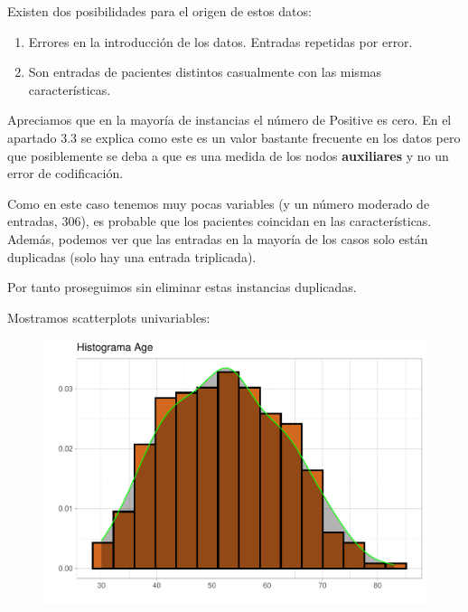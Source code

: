 \vspace{\baselineskip}

Existen dos posibilidades para el origen de estos datos:

\begin{enumerate}
    \def\labelenumi{\arabic{enumi}.}
    \item Errores en la introducción de los datos. Entradas repetidas por error.
    \item Son entradas de pacientes distintos casualmente con las mismas características.
\end{enumerate}

Apreciamos que en la mayoría de instancias el número de Positive es cero. En el apartado 3.3 se explica como este es un valor bastante frecuente en los datos pero que posiblemente se deba a que es una medida de los nodos \textbf{auxiliares} y no un error de codificación.

\vspace{\baselineskip}

Como en este caso tenemos muy pocas variables (y un número moderado de entradas, 306), es probable que los pacientes coincidan en las características. Además, podemos ver que las entradas en la mayoría de los casos solo están duplicadas (solo hay una entrada triplicada).

\vspace{\baselineskip}

Por tanto proseguimos sin eliminar estas instancias duplicadas.

\newpage
Mostramos scatterplots univariables:

\begin{figure}[H]\includegraphics[width=.9\linewidth]{img/EDA2_files/figure-latex/unnamed-chunk-10-1} \end{figure}

